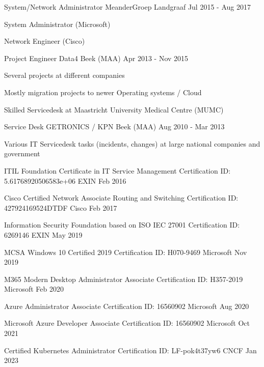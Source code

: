 \documentclass[11pt, letterpaper]{awesome-cv}
\begin{document}
\begin{cventries}
  \cventry
    {System/Network Administrator}
    {MeanderGroep}
    {Landgraaf}
    {Jul 2015 - Aug 2017}
    {
      \begin{cvitems}
        \item{System Administrator (Microsoft)}
        \item{Network Engineer (Cisco)}
      \end{cvitems}
    }


  \cventry
    {Project Engineer}
    {Data4}
    {Beek (MAA)}
    {Apr 2013 - Nov 2015}
    {
      \begin{cvitems}
        \item{Several projects at different companies}
        \item{Mostly migration projects to newer Operating systems / Cloud}
        \item{Skilled Servicedesk at Maastricht University Medical Centre (MUMC)}
      \end{cvitems}
    }


  \cventry
    {Service Desk}
    {GETRONICS / KPN}
    {Beek (MAA)}
    {Aug 2010 - Mar 2013}
    {
      \begin{cvitems}
        \item{Various IT Servicedesk tasks (incidents, changes) at large national companies and government}
      \end{cvitems}
    }



\end{cventries}

\begin{cvhonors}

  \cvhonor
    {ITIL Foundation Certificate in IT Service Management}
    {Certification ID: 5.61768920506583e+06}
    {EXIN}
    {Feb 2016}

  \cvhonor
    {Cisco Certified Network Associate Routing and Switching}
    {Certification ID: 427924169524DTDF}
    {Cisco}
    {Feb 2017}

  \cvhonor
    {Information Security Foundation based on ISO IEC 27001}
    {Certification ID: 6269146}
    {EXIN}
    {May 2019}

  \cvhonor
    {MCSA Windows 10 Certified 2019}
    {Certification ID: H070-9469}
    {Microsoft}
    {Nov 2019}

  \cvhonor
    {M365 Modern Desktop Administrator Associate}
    {Certification ID: H357-2019}
    {Microsoft}
    {Feb 2020}

  \cvhonor
    {Azure Administrator Associate}
    {Certification ID: 16560902}
    {Microsoft}
    {Aug 2020}

  \cvhonor
    {Microsoft Azure Developer Associate}
    {Certification ID: 16560902}
    {Microsoft}
    {Oct 2021}

  \cvhonor
    {Certified Kubernetes Administrator}
    {Certification ID: LF-pok4t37yw6}
    {CNCF}
    {Jan 2023}


\end{cvhonors}
\end{document}

